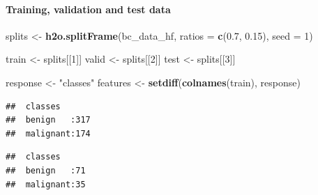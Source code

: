 \documentclass[]{article}
\newenvironment{Shaded}{\begin{snugshade}}{\end{snugshade}}
\newcommand{\KeywordTok}[1]{\textcolor[rgb]{0.13,0.29,0.53}{\textbf{{#1}}}}
\newcommand{\DataTypeTok}[1]{\textcolor[rgb]{0.13,0.29,0.53}{{#1}}}
\newcommand{\DecValTok}[1]{\textcolor[rgb]{0.00,0.00,0.81}{{#1}}}
\newcommand{\FloatTok}[1]{\textcolor[rgb]{0.00,0.00,0.81}{{#1}}}
\newcommand{\StringTok}[1]{\textcolor[rgb]{0.31,0.60,0.02}{{#1}}}
\newcommand{\OtherTok}[1]{\textcolor[rgb]{0.56,0.35,0.01}{{#1}}}
\newcommand{\NormalTok}[1]{{#1}}
\let\oldparagraph\paragraph
\renewcommand{\paragraph}[1]{\oldparagraph{#1}\mbox{}}
\begin{document}
\paragraph{Training, validation and test
data}\label{training-validation-and-test-data-1}

\begin{Shaded}
\begin{Highlighting}[]
\NormalTok{splits <-}\StringTok{ }\KeywordTok{h2o.splitFrame}\NormalTok{(bc_data_hf, }
                         \DataTypeTok{ratios =} \KeywordTok{c}\NormalTok{(}\FloatTok{0.7}\NormalTok{, }\FloatTok{0.15}\NormalTok{), }
                         \DataTypeTok{seed =} \DecValTok{1}\NormalTok{)}

\NormalTok{train <-}\StringTok{ }\NormalTok{splits[[}\DecValTok{1}\NormalTok{]]}
\NormalTok{valid <-}\StringTok{ }\NormalTok{splits[[}\DecValTok{2}\NormalTok{]]}
\NormalTok{test <-}\StringTok{ }\NormalTok{splits[[}\DecValTok{3}\NormalTok{]]}

\NormalTok{response <-}\StringTok{ "classes"}
\NormalTok{features <-}\StringTok{ }\KeywordTok{setdiff}\NormalTok{(}\KeywordTok{colnames}\NormalTok{(train), response)}
\end{Highlighting}
\end{Shaded}

\begin{Shaded}
\end{Shaded}

\begin{verbatim}
##  classes       
##  benign   :317 
##  malignant:174
\end{verbatim}

\begin{Shaded}
\end{Shaded}

\begin{verbatim}
##  classes      
##  benign   :71 
##  malignant:35
\end{verbatim}

\begin{Shaded}
\end{Shaded}
\end{document}
